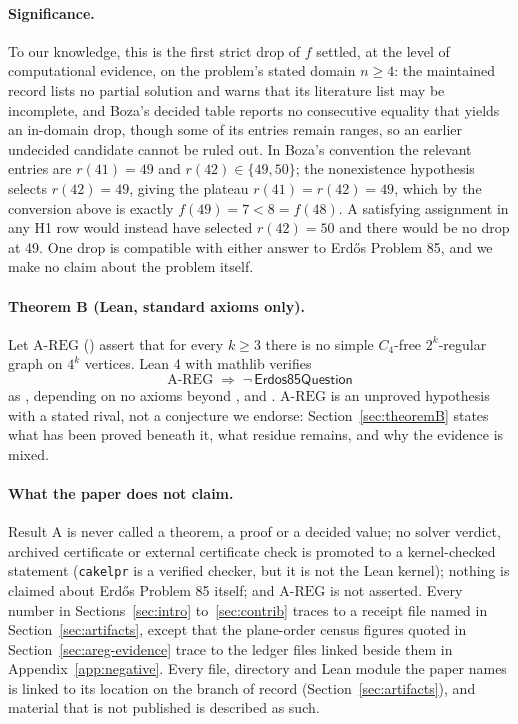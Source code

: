\documentclass{anvil-paper}
\newcommand{\AREG}{\mathrm{A\text{-}REG}}
\newcommand{\Qn}{\textsf{Erdos85Question}}
\newcommand{\cakelpr}{\texttt{cake\textunderscore lpr}}
\theoremstyle{definition}
\begin{document}
\paragraph{Significance.} To our knowledge, this is the first strict drop of $f$ settled, at the level of computational evidence, on the problem's stated domain $n\ge 4$: the maintained record \citep{bloom-erdos85} lists no partial solution and warns that its literature list may be incomplete, and Boza's decided table \citep{boza2024ramsey} reports no consecutive equality that yields an in-domain drop, though some of its entries remain ranges, so an earlier undecided candidate cannot be ruled out. In Boza's convention the relevant entries are $r(41)=49$ and $r(42)\in\{49,50\}$; the nonexistence hypothesis selects $r(42)=49$, giving the plateau $r(41)=r(42)=49$, which by the conversion above is exactly $f(49)=7<8=f(48)$. A satisfying assignment in any H1 row would instead have selected $r(42)=50$ and there would be no drop at 49. One drop is compatible with either answer to Erdős Problem 85, and we make no claim about the problem itself.

\paragraph{Theorem B (Lean, standard axioms only).} Let $\AREG$ () assert that for every $k\ge 3$ there is no simple $C_4$-free $2^k$-regular graph on $4^k$ vertices. Lean 4 \citep{moura2021lean4} with mathlib \citep{mathlib2020} verifies
\[
\AREG \;\Rightarrow\; \neg\,\Qn
\]
as , depending on no axioms beyond ,  and . $\AREG$ is an unproved hypothesis with a stated rival, not a conjecture we endorse: Section~\ref{sec:theoremB} states what has been proved beneath it, what residue remains, and why the evidence is mixed.

\paragraph{What the paper does not claim.} Result A is never called a theorem, a proof or a decided value; no solver verdict, archived certificate or external certificate check is promoted to a kernel-checked statement (\cakelpr{} is a verified checker, but it is not the Lean kernel); nothing is claimed about Erdős Problem 85 itself; and $\AREG$ is not asserted. Every number in Sections~\ref{sec:intro} to~\ref{sec:contrib} traces to a receipt file named in Section~\ref{sec:artifacts}, except that the plane-order census figures quoted in Section~\ref{sec:areg-evidence} trace to the ledger files linked beside them in Appendix~\ref{app:negative}. Every file, directory and Lean module the paper names is linked to its location on the branch of record (Section~\ref{sec:artifacts}), and material that is not published is described as such.
\end{document}
